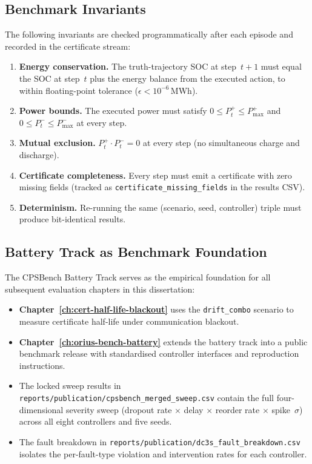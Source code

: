 \subsection{Benchmark Invariants}

The following invariants are checked programmatically after each episode
and recorded in the certificate stream:

\begin{enumerate}
  \item \textbf{Energy conservation.}  The truth-trajectory SOC at
    step~$t+1$ must equal the SOC at step~$t$ plus the energy balance
    from the executed action, to within floating-point tolerance
    ($\epsilon < 10^{-6}$\,MWh).
  \item \textbf{Power bounds.}  The executed power must satisfy
    $0 \le P_t^{+} \le P_{\max}^{+}$ and
    $0 \le P_t^{-} \le P_{\max}^{-}$ at every step.
  \item \textbf{Mutual exclusion.}  $P_t^{+} \cdot P_t^{-} = 0$ at every
    step (no simultaneous charge and discharge).
  \item \textbf{Certificate completeness.}  Every step must emit a
    certificate with zero missing fields (tracked as
    \texttt{certificate\_missing\_fields} in the results CSV).
  \item \textbf{Determinism.}  Re-running the same (scenario, seed,
    controller) triple must produce bit-identical results.
\end{enumerate}

\subsection{Battery Track as Benchmark Foundation}

The CPSBench Battery Track serves as the empirical foundation for all
subsequent evaluation chapters in this dissertation:

\begin{itemize}
  \item \textbf{Chapter~\ref{ch:cert-half-life-blackout}} uses the
    \texttt{drift\_combo} scenario to measure certificate half-life under
    communication blackout.
  \item \textbf{Chapter~\ref{ch:orius-bench-battery}} extends the battery
    track into a public benchmark release with standardised controller
    interfaces and reproduction instructions.
  \item The locked sweep results in
    \texttt{reports/publication/cpsbench\_merged\_sweep.csv} contain
    the full four-dimensional severity sweep (dropout rate $\times$
    delay $\times$ reorder rate $\times$ spike~$\sigma$) across all
    eight controllers and five seeds.
  \item The fault breakdown in
    \texttt{reports/publication/dc3s\_fault\_breakdown.csv} isolates
    the per-fault-type violation and intervention rates for each
    controller.
\end{itemize}

